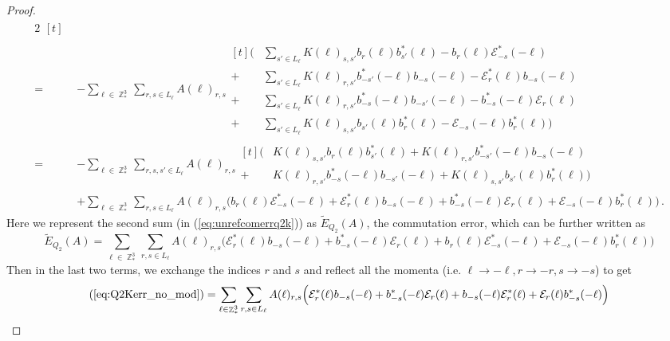 \documentclass[sn-mathphys, Numbered ,a4paper]{sn-jnl}%
\DeclareMathOperator{\Z}{\mathbb{Z}}
\theoremstyle{plain}
\theoremstyle{definition}
\theoremstyle{remark}
\theoremstyle{plain}
\theoremstyle{definition}
\theoremstyle{remark}
\begin{document}
\begin{proof}
\begin{alignat}{2}
\begin{aligned}[t]
    \end{aligned}\nonumber\\
    = &-\sum\limits_{\ell \in \Z^3_*}\sum\limits_{r,s \in L_{\ell}}A(\ell)_{r,s}\begin{aligned}[t]
        \Big(&\sum\limits_{s'\in L_{\ell}}K(\ell)_{s,s'}b_{r}(\ell)b^*_{s'}(\ell) - b_{r}(\ell) \mathcal{E}^*_{-s}(-\ell)\\ + &\sum\limits_{s'\in L_{\ell}}K(\ell)_{r,s'}b^*_{-s'}(-\ell)b_{-s}(-\ell) - \mathcal{E}^*_{r}(\ell)b_{-s}(-\ell)\\+&\sum\limits_{s'\in L_{\ell}} K(\ell)_{r,s'}b^*_{-s}(-\ell)b_{-s'}(-\ell) -b^*_{-s}(-\ell) \mathcal{E}_{r}(\ell)\\ + &\sum\limits_{s'\in L_{\ell}}K(\ell)_{s,s'}b_{s'}(\ell)b^*_{r}(\ell) - \mathcal{E}_{-s}(-\ell)b^*_{r}(\ell) \Big)
    \end{aligned}\nonumber\\
     =&-\sum\limits_{\ell \in \Z^3_*}\sum\limits_{r,s,s' \in L_{\ell}}A(\ell)_{r,s}\begin{aligned}[t]
        \Big(&K(\ell)_{s,s'}b_{r}(\ell)b^*_{s'}(\ell)  + K(\ell)_{r,s'}b^*_{-s'}(-\ell)b_{-s}(-\ell) \\+& K(\ell)_{r,s'}b^*_{-s}(-\ell)b_{-s'}(-\ell) + K(\ell)_{s,s'}b_{s'}(\ell)b^*_{r}(\ell)\Big)
        \end{aligned}\nonumber\\
    &+\sum\limits_{\ell \in \Z^3_*}\sum\limits_{r,s \in L_{\ell}}A(\ell)_{r,s}\Big(b_{r}(\ell) \mathcal{E}^*_{-s}(-\ell) +\mathcal{E}^*_{r}(\ell)b_{-s}(-\ell) +b^*_{-s}(-\ell) \mathcal{E}_{r}(\ell)+ \mathcal{E}_{-s}(-\ell)b^*_{r}(\ell) \Big)\, .\label{eq:unrefcomerrq2k}
\end{alignat}
Here we represent the second sum (in (\ref{eq:unrefcomerrq2k})) as $\tilde{E}_{Q_2}(A)$, the commutation error, which can be further written as
\begin{equation}
    \tilde E_{Q_2}(A) = \sum\limits_{\ell \in \Z^3_*}\sum\limits_{r,s \in L_{\ell}}A(\ell)_{r,s}\Big( \mathcal{E}^*_{r}(\ell)b_{-s}(-\ell) +b^*_{-s}(-\ell) \mathcal{E}_{r}(\ell)+b_{r}(\ell) \mathcal{E}^*_{-s}(-\ell)+ \mathcal{E}_{-s}(-\ell)b^*_{r}(\ell) \Big)\label{eq:Q2Kerr_no_mod}
\end{equation}
Then in the last two terms, we exchange the indices $r$ and $s$ and reflect all the momenta (i.e. $\ell\rightarrow -\ell,r\rightarrow -r,s\rightarrow -s$) to get
\begin{align}
    (\ref{eq:Q2Kerr_no_mod})&=\sum\limits_{\ell \in \Z^3_*}\sum\limits_{r,s \in L_{\ell}}A(\ell)_{r,s}\Big( \mathcal{E}^*_{r}(\ell)b_{-s}(-\ell) +b^*_{-s}(-\ell) \mathcal{E}_{r}(\ell)+b_{-s}(-\ell) \mathcal{E}^*_{r}(\ell)+ \mathcal{E}_{r}(\ell)b^*_{-s}(-\ell) \Big)\nonumber\\

\end{align}
\end{proof}
\end{document}
